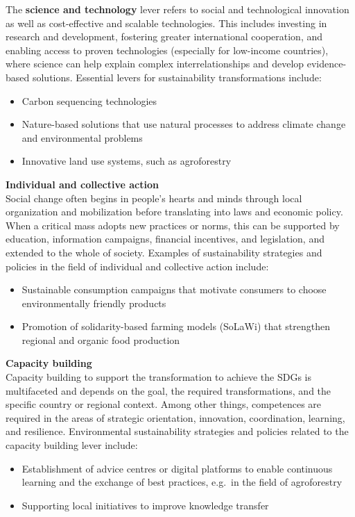 \documentclass[
  a4paper,
  DIV=11,
  numbers=noendperiod,
  oneside,
  openany]{scrreprt}
\begin{document}
The \textbf{science and technology} lever refers to social and
technological innovation as well as cost-effective and scalable
technologies. This includes investing in research and development,
fostering greater international cooperation, and enabling access to
proven technologies (especially for low-income countries), where science
can help explain complex interrelationships and develop evidence-based
solutions. Essential levers for sustainability transformations include:

\begin{itemize}
\item
  Carbon sequencing technologies
\item
  Nature-based solutions that use natural processes to address climate
  change and environmental problems
\item
  Innovative land use systems, such as agroforestry
\end{itemize}

\textbf{Individual and collective action}\\
Social change often begins in people's hearts and minds through local
organization and mobilization before translating into laws and economic
policy. When a critical mass adopts new practices or norms, this can be
supported by education, information campaigns, financial incentives, and
legislation, and extended to the whole of society. Examples of
sustainability strategies and policies in the field of individual and
collective action include:

\begin{itemize}
\item
  Sustainable consumption campaigns that motivate consumers to choose
  environmentally friendly products
\item
  Promotion of solidarity-based farming models (SoLaWi) that strengthen
  regional and organic food production
\end{itemize}

\textbf{Capacity building}\\
Capacity building to support the transformation to achieve the SDGs is
multifaceted and depends on the goal, the required transformations, and
the specific country or regional context. Among other things,
competences are required in the areas of strategic orientation,
innovation, coordination, learning, and resilience. Environmental
sustainability strategies and policies related to the capacity building
lever include:

\begin{itemize}
\item
  Establishment of advice centres or digital platforms to enable
  continuous learning and the exchange of best practices, e.g.~in the
  field of agroforestry
\item
  Supporting local initiatives to improve knowledge transfer\\
\end{itemize}
\end{document}
